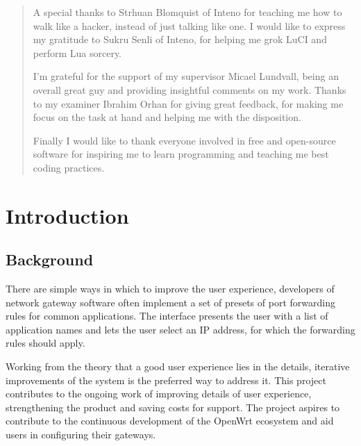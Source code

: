 \documentclass[a4paper,11pt,makeidx]{kth-bcs}
\newcommand\blankpage{%
    \null
    \thispagestyle{empty}%
    \addtocounter{page}{-1}%
    \newpage}
\begin{document}
\renewcommand{\abstractname}{Acknowledgements}
\begin{abstract}
A special thanks to Strhuan Blomquist of Inteno for teaching me how to walk like a hacker, instead of just talking like one.
I would like to express my gratitude to Sukru Senli of Inteno, for helping me grok LuCI and perform Lua sorcery.

I'm grateful for the support of my supervisor Micael Lundvall, being an overall great guy and providing insightful comments on my work.
Thanks to my examiner Ibrahim Orhan for giving great feedback, for making me focus on the task at hand and helping me with the disposition.

Finally I would like to thank everyone involved in free and open-source software for inspiring me to learn programming and teaching me best coding practices.
\newpage
\blankpage
\end{abstract}
\clearpage

\tableofcontents*
\mainmatter
\pagestyle{newchap}
\chapter{Introduction}
\section{Background}
There are simple ways in which to improve the user experience, developers of network gateway software often implement a set of presets of port forwarding rules for common applications.
The interface presents the user with a list of application names and lets the user select an IP address, for which the forwarding rules should apply.

Working from the theory that a good user experience lies in the details, iterative improvements of the system is the preferred way to address it.
This project contributes to the ongoing work of improving details of user experience, strengthening the product and saving costs for support.
The project aspires to contribute to the continuous development of the OpenWrt ecosystem and aid users in configuring their gateways.
\end{document}
